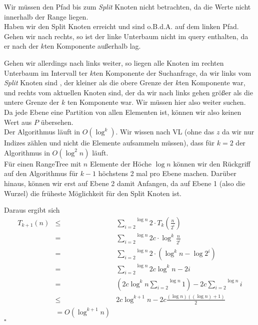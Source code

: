 \documentclass[11pt,a4paper,ngerman]{article}
\begin{document}
Wir müssen den Pfad bis zum \emph{Split} Knoten nicht betrachten, da die Werte nicht innerhalb der Range liegen.\\
Haben wir den Split Knoten erreicht und sind o.B.d.A. auf dem linken Pfad. Gehen wir nach rechts,
so ist der linke Unterbaum nicht im query enthalten, da er nach der $k$ten Komponente außerhalb lag.

Gehen wir allerdings nach links weiter, so liegen alle Knoten im rechten Unterbaum im Intervall ter $k$ten Komponente der
Suchanfrage, da wir links vom \emph{Split} Knoten sind , der kleiner als die obere Grenze der $k$ten Komponente war, und
rechts vom aktuellen Knoten sind, der da wir nach links gehen größer als die untere Grenze der $k$ ten Komponente war.
Wir müssen hier also weiter suchen.\\
Da jede Ebene eine Partition von allen Elementen ist, können wir also keinen Wert aus $P$ übersehen.\\

Der Algorithmus läuft in $O(\log^{k})$. Wir wissen nach VL (ohne das $z$ da wir nur Indizes zählen und
nicht die Elemente aufsammeln müssen), dass für $k=2$ der Algorithmus
in $O(\log^2 n)$ läuft.\\

Für einen RangeTree mit $n$ Elemente der Höche $\log n$ können wir den Rückgriff auf den Algorithmus für $k-1$ höchstens
2 mal pro Ebene machen. Darüber hinaus, können wir erst auf Ebene 2 damit Anfangen, da auf Ebene 1 (also die Wurzel) die
früheste Möglichkeit für den Split Knoten ist.

Daraus ergibt sich
\begin{equation*}\begin{array}{rcl}
    T_{k+1}(n) &\leq& \overset{\log n}{\underset{i = 2}{\sum}} 2 \cdot T_k(\frac{n}{2^i})\\
        &=& \overset{\log n}{\underset{i=2}{\sum}} 2 c \cdot \log^k \frac{n}{2^i}\\
        &=& \overset{\log n}{\underset{i=2}{\sum}} 2 \cdot (\log^k n - \log 2^i)\\
        &=& \overset{\log n}{\underset{i=2}{\sum}} 2 c \log^k n - 2i\\
        &=& \left( 2c \log^k n \overset{\log n}{\underset{i=2}{\sum}} 1 \right) - 2c \overset{\log n}{\underset{i=2}{\sum}} i\\
        &\leq& 2c  \log^{k+1} n - 2c \frac{(\log n)((\log n) + 1)}{2}\\
        &= O(\log^{k+1} n)
\end{array}\end{equation*}
\mbox{}\hfill $\square$
\label{LastPage}
\end{document}
